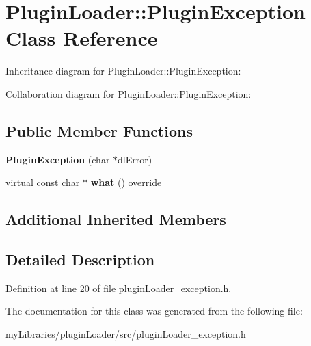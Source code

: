 \hypertarget{classPluginLoader_1_1PluginException}{}\section{Plugin\+Loader\+::Plugin\+Exception Class Reference}
\label{classPluginLoader_1_1PluginException}


Inheritance diagram for Plugin\+Loader\+::Plugin\+Exception\+:


Collaboration diagram for Plugin\+Loader\+::Plugin\+Exception\+:
\subsection*{Public Member Functions}
\begin{DoxyCompactItemize}
\item 
\mbox{\label{classPluginLoader_1_1PluginException_a4f1c62fb2ea44a806e291c365fef14cc}} 
{\bfseries Plugin\+Exception} (char $\ast$dl\+Error)
\item 
\mbox{\label{classPluginLoader_1_1PluginException_a7ff53cf5dbee4baeefd38e80d17f3e6e}} 
virtual const char $\ast$ {\bfseries what} () override
\end{DoxyCompactItemize}
\subsection*{Additional Inherited Members}


\subsection{Detailed Description}


Definition at line 20 of file plugin\+Loader\+\_\+exception.\+h.



The documentation for this class was generated from the following file\+:\begin{DoxyCompactItemize}
\item 
my\+Libraries/plugin\+Loader/src/plugin\+Loader\+\_\+exception.\+h\end{DoxyCompactItemize}
